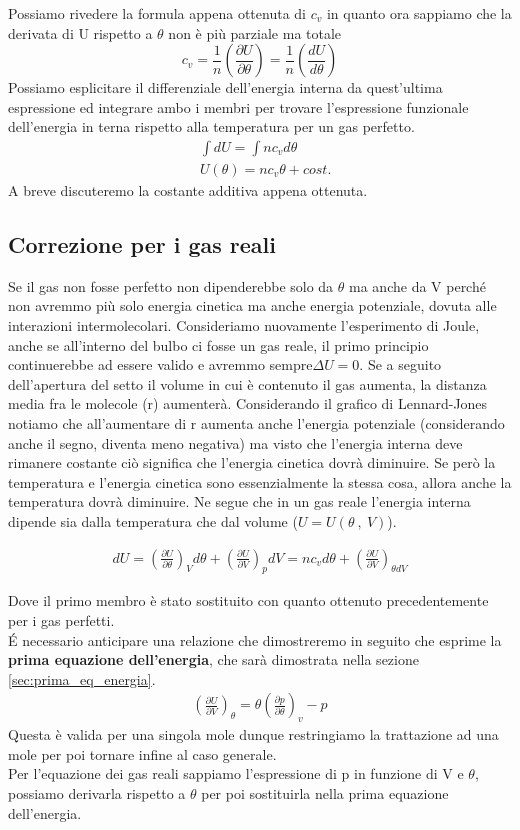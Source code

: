 \documentclass[10pt,a4paper]{article}
\begin{document}
Possiamo rivedere la formula appena ottenuta di \(c_v\) in quanto ora sappiamo che la derivata di U rispetto a $\theta$ non è più parziale ma totale
\[c_v =\frac{1}{n}\left(\frac{\partial U}{\partial\theta}\right)=\frac{1}{n}\left(\frac{dU}{d\theta}\right)\]
Possiamo esplicitare il differenziale dell'energia interna da quest'ultima espressione ed integrare ambo i membri per trovare l'espressione funzionale dell'energia in terna rispetto alla temperatura per un gas perfetto.
\begin{align}\label{eq:U_gas_perfetti}
	&\int dU = \int n c_v d\theta\nonumber\\
	&U(\theta) = n c_v \theta + cost.
\end{align} 
A breve discuteremo la costante additiva appena ottenuta.
\subsection{Correzione per i gas reali}
Se il gas non fosse perfetto non dipenderebbe solo da $\theta$ ma anche da V perché non avremmo più solo energia cinetica ma anche energia potenziale, dovuta alle interazioni intermolecolari. Consideriamo nuovamente l'esperimento di Joule, anche se all'interno del bulbo ci fosse un gas reale, il primo principio continuerebbe ad essere valido e avremmo sempre\(\Delta U = 0\). Se a seguito dell'apertura del setto il volume in cui è contenuto il gas aumenta, la distanza media fra le molecole (r) aumenterà. Considerando il grafico di Lennard-Jones notiamo che all'aumentare di r aumenta anche l'energia potenziale (considerando anche il segno, diventa meno negativa) ma visto che l'energia interna deve rimanere costante ciò significa che l'energia cinetica dovrà diminuire. Se però la temperatura e l'energia cinetica sono essenzialmente la stessa cosa, allora anche la temperatura dovrà diminuire. Ne segue che in un gas reale l'energia interna dipende sia dalla temperatura che dal volume (\(U = U(\theta\ ,\ V)\)). 

\begin{align*} 
	dU = \left(\frac{\partial U}{\partial \theta}\right)_V d\theta + \left(\frac{\partial U}{\partial V}\right)_p dV = n c_v d\theta +\left(\frac{\partial U}{\partial V}\right)_{\theta dV}
\end{align*} 

Dove il primo membro è stato sostituito con quanto ottenuto precedentemente per i gas perfetti.\\
\'{E} necessario anticipare una relazione che dimostreremo in seguito che esprime la \textbf{prima equazione dell'energia}, che sarà dimostrata nella sezione \ref{sec:prima_eq_energia}.
\begin{align}\label{eq:prima_eq_energia}
	\left(\frac{\partial U}{\partial V}\right)_{\theta} = \theta \left(\frac{\partial p}{\partial \theta}\right)_v - p 
\end{align}
Questa è valida per una singola mole dunque restringiamo la trattazione ad una mole per poi tornare infine al caso generale.\\
Per l'equazione dei gas reali sappiamo l'espressione di p in funzione di V e \(\theta\), possiamo derivarla rispetto a $\theta$ per poi sostituirla nella prima equazione dell'energia. 
\end{document}
